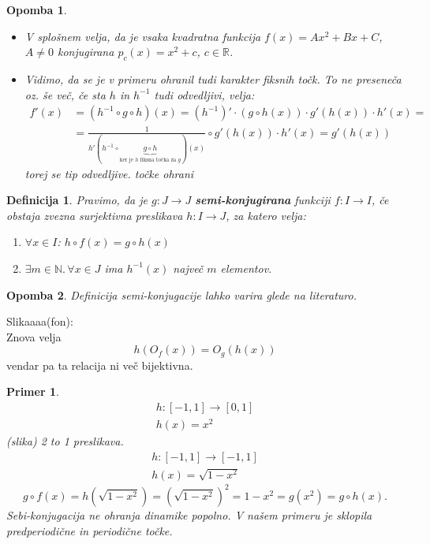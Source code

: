 \documentclass{article}
\newtheorem{definicija}{Definicija}
\newtheorem{opomba}{Opomba}
\newtheorem{primer}{Primer}
\newcommand{\N}{\mathbb{N}}
\newcommand{\R}{\mathbb{R}}
\begin{document}
\begin{opomba}
\begin{itemize}
\item V splošnem velja, da je vsaka kvadratna funkcija $f(x) = Ax^2+ Bx + C$, $A \neq 0$ konjugirana $p_c(x) = x^2 + c$, $c\in \R$.
\item Vidimo, da se je v primeru ohranil tudi karakter fiksnih točk. To ne preseneča oz. še več, če sta $h$ in $h^{-1}$ tudi odvedljivi, velja:
\begin{align*}
f'(x) &= (h^{-1} \circ g \circ h)(x) = (h^{-1})'\cdot (g\circ h(x)) \cdot g'(h(x)) \cdot h'(x) = \\ 
&= \frac{1}{h'(h^{-1}\circ \underbrace{g\circ h}_{\text{ker je $h$ fiksna točka za }g})(x)} \circ g'(h(x))\cdot h'(x) = g'(h(x))
\end{align*}
torej se tip odvedljive. točke ohrani
\end{itemize}
\end{opomba}

\begin{definicija}
Pravimo, da je $g: J \rightarrow J$ \textbf{semi-konjugirana} funkciji $f: I \rightarrow I$, če obstaja zvezna surjektivna preslikava $h:I \rightarrow J$, za katero velja:
\begin{enumerate}
\item[i)] $\forall x\in I$: $h\circ f(x) = g \circ h(x)$
\item[ii)] $\exists m\in \N.\, \forall x\in J$ ima $h^{-1}(x)$ največ $m$ elementov.
\end{enumerate}
\end{definicija}

\begin{opomba}
Definicija semi-konjugacije lahko varira glede na literaturo.
\end{opomba}

Slikaaaa(fon):\\
Znova velja 
$$
h(O_f(x)) = O_g(h(x))
$$
vendar pa ta relacija ni več bijektivna.

\begin{primer}
\begin{align*}
h:[-1, 1] \rightarrow [0, 1] \\ 
h(x) = x^2
\end{align*}
(slika) 2 to 1 preslikava. 
\begin{align*}
h:[-1, 1] \rightarrow [-1, 1] \\ 
h(x) = \sqrt{1 - x^2}
\end{align*}
$$
g\circ f(x) = h(\sqrt{1 - x^2}) = (\sqrt{1 - x^2})^2 = 1 - x^2 = g(x^2) = g\circ h(x).
$$
Sebi-konjugacija ne ohranja dinamike popolno. V našem primeru je sklopila predperiodične in periodične točke.
\end{primer}
\end{document}
